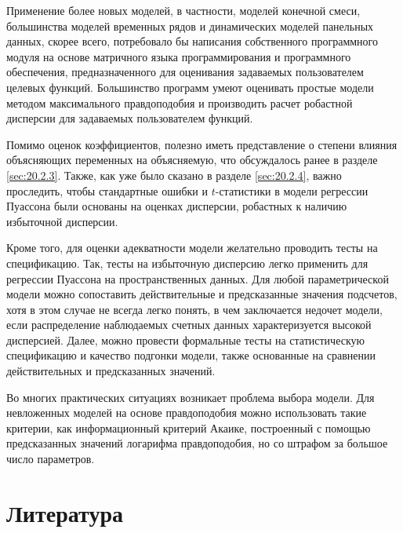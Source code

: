 Применение более новых моделей, в частности, моделей конечной смеси, большинства моделей временных рядов и динамических моделей панельных данных, скорее всего, потребовало бы написания собственного программного модуля на основе матричного языка программирования и программного обеспечения, предназначенного для оценивания задаваемых пользователем целевых функций. Большинство программ умеют оценивать простые модели методом максимального правдоподобия и производить расчет робастной дисперсии для задаваемых пользователем функций.

Помимо оценок коэффициентов, полезно иметь представление о степени влияния объясняющих переменных на объясняемую, что обсуждалось ранее в разделе \ref{sec:20.2.3}. Также, как уже было сказано в разделе \ref{sec:20.2.4}, важно проследить, чтобы стандартные ошибки и $t$-статистики в модели регрессии Пуассона были основаны на оценках дисперсии, робастных к наличию избыточной дисперсии.

Кроме того, для оценки адекватности модели желательно проводить тесты на спецификацию. Так, тесты на избыточную дисперсию легко применить для регрессии Пуассона на пространственных данных. Для любой параметрической модели можно сопоставить действительные и предсказанные значения подсчетов, хотя в этом случае не всегда легко понять, в чем заключается недочет модели, если распределение наблюдаемых счетных данных характеризуется высокой дисперсией. Далее, можно провести формальные тесты на статистическую спецификацию и качество подгонки модели, также основанные на сравнении действительных и предсказанных значений.

Во многих практических ситуациях возникает проблема выбора модели. Для невложенных моделей на основе правдоподобия можно использовать такие критерии, как информационный критерий Акаике, построенный с помощью предсказанных значений логарифма правдоподобия, но со штрафом за большое число параметров.




\section{Литература}\label{sec:20.9}

